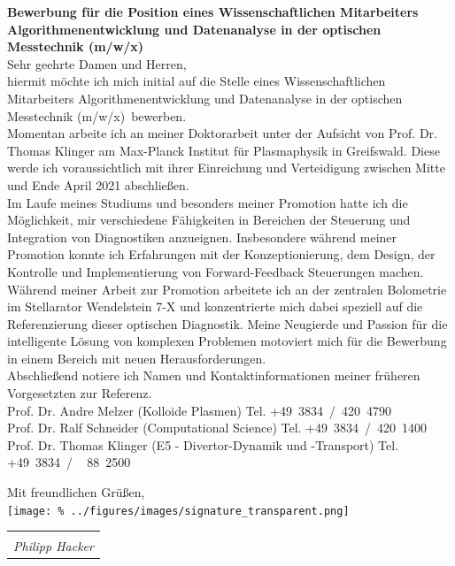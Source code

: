 \documentclass[11pt,a4paper]{moderncv}
\makeatletter
\newcommand{\position}{%
    Wissenschaftlichen Mitarbeiters Algorithmenentwicklung und Datenanalyse in der optischen Messtechnik (m/w/x)}
\newcommand{\sign}[1]{%
  \begin{tabular}[t]{@{}l@{}}
  \makebox[1.5in]{\dotfill}\\
  \strut\emph{#1}\strut%
  \end{tabular}%
}
\makeatother
\begin{document}
    \vspace*{1.0cm}
    {\bfseries \color{familynamecolor}%
        Bewerbung für die Position eines \position%
    }\\[0.75cm]
%
    Sehr geehrte Damen und Herren,\\[0.75cm]
%
    hiermit möchte ich mich initial auf die Stelle eines \position~bewerben.\\[0.75cm]  %
%
    Momentan arbeite ich an meiner Doktorarbeit unter der Aufsicht von Prof. Dr. Thomas Klinger am Max-Planck Institut für Plasmaphysik in Greifswald. Diese werde ich voraussichtlich mit ihrer Einreichung und Verteidigung zwischen Mitte und Ende April 2021 abschließen.\\[0.75cm]%
%
    Im Laufe meines Studiums und besonders meiner Promotion hatte ich die Möglichkeit, mir verschiedene Fähigkeiten in Bereichen der Steuerung und Integration von Diagnostiken anzueignen. Insbesondere während meiner Promotion konnte ich Erfahrungen mit der Konzeptionierung, dem Design, der Kontrolle und Implementierung von Forward-Feedback Steuerungen machen. Während meiner Arbeit zur Promotion arbeitete ich an der zentralen Bolometrie im Stellarator Wendelstein 7-X und konzentrierte mich dabei speziell auf die Referenzierung dieser optischen Diagnostik. Meine Neugierde und Passion für die intelligente Lösung von komplexen Problemen motoviert mich für die Bewerbung in einem Bereich mit neuen Herausforderungen.\\[0.75cm]%
%
    Abschließend notiere ich Namen und Kontaktinformationen meiner früheren Vorgesetzten zur Referenz.\\[0.2cm]
    \hspace*{0.5cm}Prof. Dr. Andre Melzer (Kolloide Plasmen)%
        \hfill Tel. +49~3834~/~420~4790\\
    \hspace*{0.5cm}Prof. Dr. Ralf Schneider (Computational Science)%
        \hfill Tel. +49~3834~/~420~1400\\
    \hspace*{0.5cm}Prof. Dr. Thomas Klinger (E5 - Divertor-Dynamik und -Transport)%
        \hfill Tel. +49~3834~/~~\,88~2500\\
%
    \vspace*{0.3cm}
    \begin{flushleft}
        Mit freundlichen Grüßen,\\[0.75cm]
        \vspace*{-1.0cm}%
        \texttt{[image: \%
            ../figures/images/signature\_transparent.png]}
        \hspace*{-4.0cm}\sign{Philipp Hacker}\\[0.0cm]
    \end{flushleft}
\end{document}
